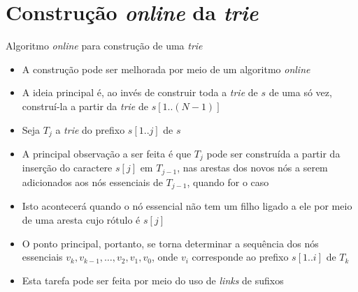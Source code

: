 \section{Construção {\it online} da {\it trie}}

\begin{frame}[fragile]{Algoritmo {\it online} para construção de uma {\it trie}}

    \begin{itemize}
        \item A construção pode ser melhorada por meio de um algoritmo \textit{online}

        \item A ideia principal é, ao invés de construir toda a \textit{trie} de $s$ de uma só 
            vez, construí-la a partir da \textit{trie} de $s[1..(N-1)]$ 

        \item Seja $T_j$ a \textit{trie} do prefixo $s[1..j]$ de $s$ 

        \item A principal observação a ser feita é que $T_j$ pode ser construída a partir da 
            inserção do caractere $s[j]$ em $T_{j - 1}$, nas arestas dos novos nós a serem 
            adicionados aos nós essenciais de $T_{j - 1}$, quando for o caso

        \item Isto acontecerá quando o nó essencial não tem um filho ligado a ele por meio de 
            uma aresta cujo rótulo é $s[j]$

        \item O ponto principal, portanto, se torna determinar a sequência dos nós essenciais 
            $v_k, v_{k-1}, \ldots, v_2, v_1, v_0$, onde $v_i$ corresponde ao prefixo 
            $s[1..i]$ de $T_k$

        \item Esta tarefa pode ser feita por meio do uso de \textit{links} de sufixos
    \end{itemize}

\end{frame}

